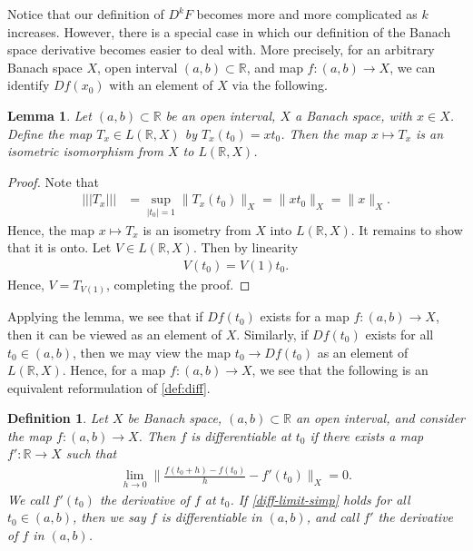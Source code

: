 \documentclass[12pt,reqno]{amsart}
\numberwithin{equation}{section}  %
\newcommand{\rr}{\mathbb{R}}
\newtheorem{lemma}[theorem]{Lemma}
\newtheorem{definition}[theorem]{Definition}
\begin{document}
Notice that our definition of $D^{k}F$ becomes more and more complicated as $k$
increases. However, there is a special case in which our definition of the
Banach space derivative becomes easier to deal with. More precisely, for an
arbitrary Banach space $X$, open interval $(a,b) \subset \rr$, and map $f:(a,b)
\to X$, we can identify $Df(x_0)$ with an element of $X$ via the following.
%
%
%
%
%
%
%
%
\begin{lemma}
	\label{lem:isometry} Let $(a,b) \subset \rr$ be an open interval, $X$ a Banach
	space, with $x \in X$. Define the map $T_x \in L\left ( \rr , X \right )$ by
	$T_x(t_0) = x t_0$. Then the map $x \mapsto T_x$ is an
	isometric isomorphism from
	$X$ to $L(\rr , X)$. 
\end{lemma}
%
%
\begin{proof} Note that 
%
%
\begin{equation*}
	\begin{split}
		| | | T_x | | |
		& = \sup_{|t_0| = 1} \| T_x (t_0) \|_X
		= \| x t_0\|_X
		= \|x\|_X.
	\end{split}
\end{equation*}
%
%
Hence, the map $x \mapsto T_x$ is an isometry from $X$ into $L(\rr,
X)$. It remains to show that it is onto. Let $V \in L( \rr, X)$. Then
by linearity
%
%
\begin{equation*}
	\begin{split}
		V(t_0) = V(1)t_0. 
	\end{split}
\end{equation*}
%
%
Hence, $V = T_{V(1)}$, completing the proof. 
\end{proof}
%
%
Applying the lemma, we see that if $Df(t_0)$ exists for a map $f: (a,b) \to X$,
then it can be viewed as an
element of $X$. Similarly, if $Df(t_0)$ exists for all $t_0 \in (a,b)$, then
we may view the map $t_0 \to Df(t_0)$ as an
element of $L( \rr, X)$. Hence, for a
map $f:(a,b) \to X$, we see that the following is an equivalent
reformulation of \autoref{def:diff}. 
\begin{definition}
	\label{def:diff-simp}
	Let $X$ be Banach space, $(a,b) \subset \rr$ an open interval, and
	consider the map $f: (a,b) \to X$.
	Then $f$ is \emph{differentiable at $t_0$} if there exists a map
	$f': \rr \to X$ such that 
	\begin{equation}
		\label{diff-limit-simp}
		\begin{split}
			\lim_{h \to 0} \| \frac{f(t_0+ h) - f(t_0) 
			 }{h} - f'(t_0) \|_X = 0.
		\end{split}
	\end{equation}
	We call $f'(t_0)$ the \emph{derivative of $f$ at $t_0$}.
	If \eqref{diff-limit-simp}
	holds for all $t_0 \in (a,b)$, then we say $f$ is \emph{differentiable in
	$(a,b)$}, and call $f'$ the
	\emph{derivative of $f$ in $(a,b)$}.  
\end{definition}
\end{document}
